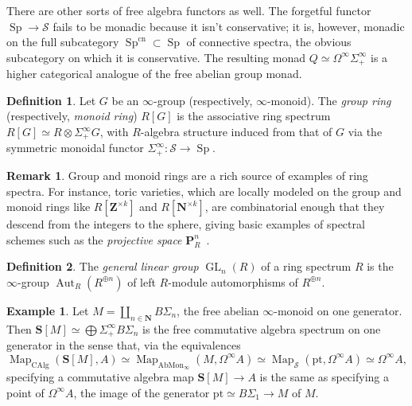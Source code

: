 \documentclass{article}
\theoremstyle{definition}
\newtheorem{definition}{Definition}[subsection]
\newtheorem{example}{Example}[subsection]
\newtheorem{remark}{Remark}[subsection]
\renewcommand{\S}{\mathcal{S}}
\newcommand{\NN}{\mathbf{N}}
\newcommand{\PP}{\mathbf{P}}
\renewcommand{\SS}{\mathbf{S}}
\newcommand{\ZZ}{\mathbf{Z}}
\renewcommand{\i}{\infty}
\DeclareMathOperator{\CAlg}{CAlg}
\DeclareMathOperator{\Aut}{Aut}
\DeclareMathOperator{\Map}{Map}
\DeclareMathOperator{\Sp}{Sp}
\DeclareMathOperator{\GL}{GL}
\newcommand{\cn}{\mathrm{cn}}
\newcommand{\pt}{\mathrm{pt}}
\begin{document}
There are other sorts of free algebra functors as well.
The forgetful functor $\Sp\to\S$ fails to be monadic because it isn't conservative; it is, however, monadic on the full subcategory $\Sp^{\cn}\subset\Sp$ of connective spectra, the obvious subcategory on which it is conservative.
The resulting monad $Q\simeq\Omega^\infty\Sigma^\infty_+$ is a higher categorical analogue of the free abelian group monad.




\begin{definition}
Let $G$ be an $\infty$-group (respectively, $\infty$-monoid).
The {\em group ring} (respectively, {\em monoid ring}) $R[G]$ is the associative ring spectrum $R[G]\simeq R\otimes\Sigma^\infty_+ G$, with $R$-algebra structure induced from that of $G$ via the symmetric monoidal functor $\Sigma^\infty_+:\S\to\Sp$.
\end{definition}

\begin{remark}
Group and monoid rings are a rich source of examples of ring spectra.
For instance, toric varieties, which are locally modeled on the group and monoid rings like $R[\ZZ^{\times k}]$ and $R[\NN^{\times k}]$, are combinatorial enough that they descend from the integers to the sphere, giving basic examples of spectral schemes such as the {\em projective space} $\PP^n_R$~\cite[Construction 5.4.1.3]{SAG}.
\end{remark}

\begin{definition}
The {\em general linear group} $\GL_n(R)$ of a ring spectrum $R$ is the $\i$-group $\Aut_R(R^{\oplus n})$ of left $R$-module automorphisms of $R^{\oplus n}$.
\end{definition}




\begin{example}
Let $M=\coprod_{n\in\NN} B\Sigma_n$, the free abelian $\i$-monoid on one generator.
Then $\SS[M]\simeq\bigoplus\Sigma^\infty_+ B\Sigma_n$ is the free commutative algebra spectrum on one generator in the sense that, via the equivalences
\[
\Map_{\CAlg}(\SS[M],A)\simeq\Map_{\mathrm{AbMon}_\infty}(M,\Omega^\infty A)\simeq\Map_\S(\pt,\Omega^\infty A)\simeq\Omega^\infty A,
\]
specifying a commutative algebra map $\SS[M]\to A$ is the same as specifying a point of $\Omega^\infty A$, the image of the generator $\pt\simeq B\Sigma_1\to M$ of $M$.
\end{example}
\end{document}
